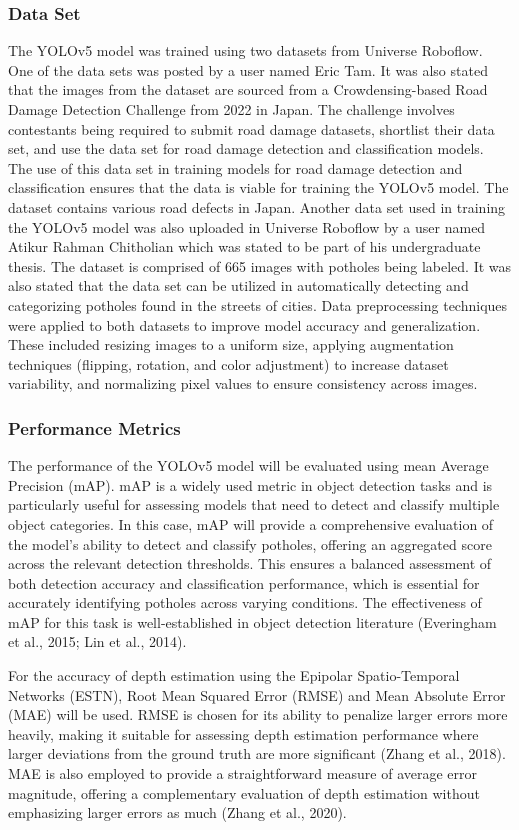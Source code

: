 \subsubsection{Data Set}
The YOLOv5 model was trained using two datasets from Universe Roboflow. One of the data sets was posted by a user named Eric Tam. It was also stated that the images from the dataset are sourced from a Crowdensing-based Road Damage Detection Challenge from 2022 in Japan. The challenge involves contestants being required to submit road damage datasets, shortlist their data set, and use the data set for road damage detection and classification models. The use of this data set in training models for road damage detection and classification ensures that the data is viable for training the YOLOv5 model. The dataset contains various road defects in Japan.
Another data set used in training the YOLOv5 model was also uploaded in Universe Roboflow by a user named Atikur Rahman Chitholian which was stated to be part of his undergraduate thesis. The dataset is comprised of 665 images with potholes being labeled. It was also stated that the data set can be utilized in automatically detecting and categorizing potholes found in the streets of cities.
Data preprocessing techniques were applied to both datasets to improve model accuracy and generalization. These included resizing images to a uniform size, applying augmentation techniques (flipping, rotation, and color adjustment) to increase dataset variability, and normalizing pixel values to ensure consistency across images. 

\subsubsection{Performance Metrics}
The performance of the YOLOv5 model will be evaluated using mean Average Precision (mAP). mAP is a widely used metric in object detection tasks and is particularly useful for assessing models that need to detect and classify multiple object categories. In this case, mAP will provide a comprehensive evaluation of the model's ability to detect and classify potholes, offering an aggregated score across the relevant detection thresholds. This ensures a balanced assessment of both detection accuracy and classification performance, which is essential for accurately identifying potholes across varying conditions. The effectiveness of mAP for this task is well-established in object detection literature (Everingham et al., 2015; Lin et al., 2014).

For the accuracy of depth estimation using the Epipolar Spatio-Temporal Networks (ESTN), Root Mean Squared Error (RMSE) and Mean Absolute Error (MAE) will be used. RMSE is chosen for its ability to penalize larger errors more heavily, making it suitable for assessing depth estimation performance where larger deviations from the ground truth are more significant (Zhang et al., 2018). MAE is also employed to provide a straightforward measure of average error magnitude, offering a complementary evaluation of depth estimation without emphasizing larger errors as much (Zhang et al., 2020).





